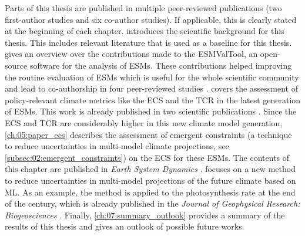 Parts of this thesis are published in multiple peer-reviewed publications (two
first-author studies and six co-author studies). If applicable, this is clearly
stated at the beginning of each chapter. 
introduces the scientific background for this thesis. This includes relevant
literature that is used as a baseline for this thesis. 
gives an overview over the contributions made to the \ac{ESMValTool}, an
open-source software for the analysis of \acp{ESM}. These contributions helped
improving the routine evaluation of \acp{ESM} which is useful for the whole
scientific community and lead to co-authorship in four peer-reviewed studies
\autocite{Righi2020, Eyring2020, Lauer2020, Weigel2020}.
 covers the assessment of
policy-relevant climate metrics like the \ac{ECS} and the \ac{TCR} in the
latest generation of \acp{ESM}. This work is already published in two
scientific publications \autocite{Bock2020, Meehl2020}. Since the \ac{ECS} and
\ac{TCR} are considerably higher in this new climate model generation,
\cref{ch:05:paper_ecs} describes the assessment of emergent constraints (a
technique to reduce uncertainties in multi-model climate projections, see
\vref{subsec:02:emergent_constraints}) on the \ac{ECS} for these \acp{ESM}. The
contents of this chapter are published in \emph{Earth System Dynamics}
\autocite{Schlund2020a}.  focuses on a new method to
reduce uncertainties in multi-model projections of the future climate based on
\ac{ML}. As an example, the method is applied to the photosynthesis rate at the
end of the  century, which is already published in the \emph{Journal of
  Geophysical Research: Biogeosciences} \autocite{Schlund2020}. Finally,
\cref{ch:07:summary_outlook} provides a summary of the results of this thesis
and gives an outlook of possible future works.